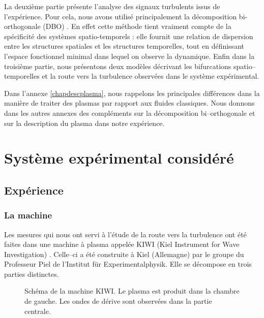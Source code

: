 \documentclass{book}
\begin{document}
La deuxi\`eme partie pr\'esente l'analyse des signaux turbulents issus
de l'exp\'erience. Pour cela, nous
avons utilis\'e principalement la d\'ecomposition bi-orthogonale (DBO)
\cite{Aubry91a,Aubry91b,Aubry92,Aubry94,Aubry95a,Aubry95b,Madon96a,Lumley72}.
En effet 
cette m\'ethode tient vraiment compte de la sp\'ecificit\'e des
syst\`emes spatio-temporels : elle fournit une relation de dispersion
entre les structures spatiales et les structures temporelles, tout en
d\'efinissant l'espace fonctionnel minimal dans lequel on observe la
dynamique. 
Enfin dans la troisi\`eme partie, nous pr\'esentons deux mod\`eles
d\'ecrivant 
les bifurcations spatio--temporelles et la route vers la turbulence
observ\'ees dans le syst\`eme exp\'erimental.

Dans l'annexe \ref{chapdescplasma}, nous rappelons les principales
diff\'erences dans la mani\`ere de traiter des plasmas par rapport aux
fluides classiques.
Nous donnons dans les autres annexes des compl\'ements sur la
d\'ecomposition 
bi--orthogonale et sur la description du plasma dans notre exp\'erience.

\part{Syst\`eme exp\'erimental consid\'er\'e}
\chapter{Exp\'erience}
\section{La machine}
Les mesures qui nous ont servi \`a l'\'etude de la
route
vers la turbulence ont \'et\'e faites dans une machine \`a plasma
appel\'ee
KIWI (Kiel Instrument for Wave Investigation) \cite{Latten95}. Celle--ci
a \'et\'e construite \`a Kiel (Allemagne) par le groupe
du Professeur Piel de l'Institut f\"ur Experimentalphysik.
Elle se d\'ecompose en trois parties distinctes.

\begin{figure}[htb]
\centerline{}

 \caption{Sch\'ema de la machine KIWI. Le plasma est produit dans la
chambre de gauche. Les ondes de d\'erive sont observ\'ees dans la partie
centrale.}
 \label{kiwi}
\end{figure}
%
\end{document}
